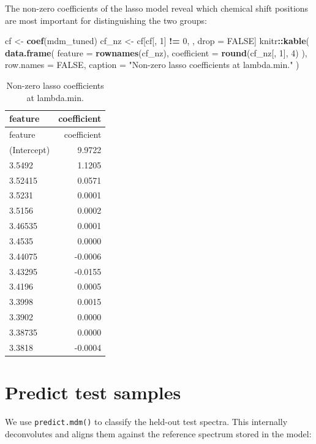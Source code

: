 \documentclass[
]{article}
\newenvironment{Shaded}{\begin{snugshade}}{\end{snugshade}}
\newcommand{\DataTypeTok}[1]{\textcolor[rgb]{0.13,0.29,0.53}{#1}}
\newcommand{\DecValTok}[1]{\textcolor[rgb]{0.00,0.00,0.81}{#1}}
\newcommand{\KeywordTok}[1]{\textcolor[rgb]{0.13,0.29,0.53}{\textbf{#1}}}
\newcommand{\NormalTok}[1]{#1}
\newcommand{\OperatorTok}[1]{\textcolor[rgb]{0.81,0.36,0.00}{\textbf{#1}}}
\newcommand{\OtherTok}[1]{\textcolor[rgb]{0.56,0.35,0.01}{#1}}
\newcommand{\StringTok}[1]{\textcolor[rgb]{0.31,0.60,0.02}{#1}}
\begin{document}
The non-zero coefficients of the lasso model reveal which chemical shift
positions are most important for distinguishing the two groups:

\begin{Shaded}
\begin{Highlighting}[]
\NormalTok{cf \textless{}{-}}\StringTok{ }\KeywordTok{coef}\NormalTok{(mdm\_tuned)}
\NormalTok{cf\_nz \textless{}{-}}\StringTok{ }\NormalTok{cf[cf[, }\DecValTok{1}\NormalTok{] }\OperatorTok{!=}\StringTok{ }\DecValTok{0}\NormalTok{, , drop =}\StringTok{ }\OtherTok{FALSE}\NormalTok{]}
\NormalTok{knitr}\OperatorTok{::}\KeywordTok{kable}\NormalTok{(}
    \KeywordTok{data.frame}\NormalTok{(}
        \DataTypeTok{feature =} \KeywordTok{rownames}\NormalTok{(cf\_nz),}
        \DataTypeTok{coefficient =} \KeywordTok{round}\NormalTok{(cf\_nz[, }\DecValTok{1}\NormalTok{], }\DecValTok{4}\NormalTok{)}
\NormalTok{    ),}
    \DataTypeTok{row.names =} \OtherTok{FALSE}\NormalTok{,}
    \DataTypeTok{caption =} \StringTok{"Non{-}zero lasso coefficients at lambda.min."}
\NormalTok{)}
\end{Highlighting}
\end{Shaded}

\begin{longtable}[]{@{}lr@{}}
\caption{Non-zero lasso coefficients at lambda.min.}\tabularnewline
\toprule
feature & coefficient\tabularnewline
\midrule
\endfirsthead
\toprule
feature & coefficient\tabularnewline
\midrule
\endhead
(Intercept) & 9.9722\tabularnewline
3.5492 & 1.1205\tabularnewline
3.52415 & 0.0571\tabularnewline
3.5231 & 0.0001\tabularnewline
3.5156 & 0.0002\tabularnewline
3.46535 & 0.0001\tabularnewline
3.4535 & 0.0000\tabularnewline
3.44075 & -0.0006\tabularnewline
3.43295 & -0.0155\tabularnewline
3.4196 & 0.0005\tabularnewline
3.3998 & 0.0015\tabularnewline
3.3902 & 0.0000\tabularnewline
3.38735 & 0.0000\tabularnewline
3.3818 & -0.0004\tabularnewline
\bottomrule
\end{longtable}

\hypertarget{predict-test-samples}{%
\section{Predict test samples}\label{predict-test-samples}}

We use \texttt{predict.mdm()} to classify the held-out test spectra.
This internally deconvolutes and aligns them against the reference
spectrum stored in the model:
\end{document}
